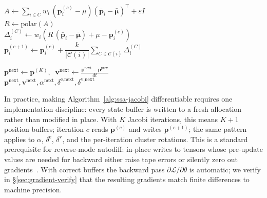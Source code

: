 \begin{algorithm}[!htbp]
{{    $A \leftarrow \sum_{i \in C} w_i\,(\mathbf{p}^{(c)}_i - \mu)
                  (\bar{\mathbf{p}}_i - \bar{\boldsymbol{\mu}})^{\!\top}
                  + \varepsilon I$
    \\

    $R \leftarrow \mathrm{polar}(A)$\\

    $\Delta_i^{(C)} \leftarrow
     w_i\!\left(R\,(\bar{\mathbf{p}}_i - \bar{\boldsymbol{\mu}})
     + \mu - \mathbf{p}^{(c)}_i\right)$\\
  }
  $\mathbf{p}^{(c+1)}_i \leftarrow \mathbf{p}^{(c)}_i +
   \dfrac{k}{|\mathcal{C}(i)|}\!\sum_{C \in \mathcal{C}(i)} \Delta_i^{(C)}$
  \\
}

$\mathbf{p}^{\text{next}} \leftarrow \mathbf{p}^{(K)},\;\;
 \mathbf{v}^{\text{next}} \leftarrow
 \frac{\mathbf{p}^{\text{next}} - \mathbf{p}^{\text{prev}}}{dt}$\\

\Return $\mathbf{p}^{\text{next}}, \mathbf{v}^{\text{next}},
        \alpha^{\text{next}},
        \delta^{\text{e,next}}, \delta^{\text{v,next}}$
\vspace{6pt}
\end{algorithm}

In practice, making Algorithm~\ref{alg:ssa-jacobi} differentiable
requires one implementation discipline: every state buffer is written
to a fresh allocation rather than modified in place. With $K$ Jacobi
iterations, this means $K{+}1$ position buffers; iteration $c$ reads
$\mathbf{p}^{(c)}$ and writes $\mathbf{p}^{(c+1)}$; the same pattern
applies to $\alpha$, $\delta^{\text{e}}$, $\delta^{\text{v}}$, and the
per-iteration cluster rotations. This is a standard prerequisite for
reverse-mode autodiff: in-place writes to tensors whose pre-update
values are needed for backward either raise tape errors or silently
zero out gradients~\cite{difftaichi}. With correct buffers the backward
pass $\partial \mathcal{L}/\partial \theta$ is automatic; we verify in
\S\ref{sec:gradient-verify} that the resulting gradients match finite
differences to machine precision.
